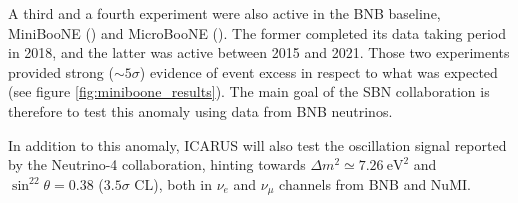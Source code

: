 A third and a fourth experiment were also active in the BNB baseline, MiniBooNE (\mboone) and MicroBooNE (\uboone). The former completed its data taking period in 2018, and the latter was active between 2015 and 2021. Those two experiments provided strong ($\sim5\sigma$) evidence of event excess \cite{MiniBooNE:2018esg} in respect to what was expected (see figure \ref{fig:miniboone_results}). The main goal of the SBN collaboration is therefore to test this anomaly using data from BNB neutrinos. 

In addition to this anomaly, ICARUS will also test the oscillation signal reported by the Neutrino-4 collaboration, hinting towards $\Delta m^2 \simeq \SI{7.26}{\electronvolt\squared}$ and $\sin^22\theta = 0.38$ ($3.5\sigma$ CL), both in $\nu_e$ and $\nu_\mu$ channels from BNB and NuMI.